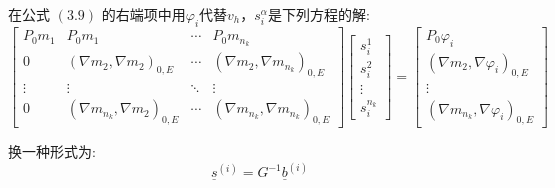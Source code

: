 在公式 $(3.9)$ 的右端项中用$\varphi_i$代替$v_h$，$s_i^{\alpha}$是下列方程的解: \\
\begin{equation*}
 \left[\begin{array}{cccc}
P_0m_1 & P_0m_1 &\cdots&P_0m_{n_k} \\
0 & (\nabla m_2,\nabla m_2)_{0,E} & \cdots & (\nabla m_2,\nabla m_{n_k})_{0,E} \\
\vdots & \vdots & \ddots & \vdots\\
0& (\nabla m_{n_k},\nabla m_2)_{0,E} & \cdots & (\nabla m_{n_k},\nabla m_{n_k})_{0,E}
\end{array}\right]
\left[\begin{array}{c}
s_i^1\\
s_i^2\\
\vdots\\
s_i^{n_k}
\end{array}\right]
= \left[\begin{array}{c}
P_0\varphi_i\\
(\nabla m_2,\nabla \varphi_i)_{0,E} \\
\vdots\\
(\nabla m_{n_k},\nabla \varphi_i)_{0,E}
\end{array}\right]
\end{equation*}

换一种形式为: \\
\begin{equation*}
\underline s^{(i)} = G^{-1}\underline b^{(i)}
\end{equation*}

